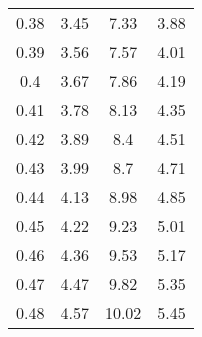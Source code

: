 \begin{table}
\begin{tabular}{cccc}
0.38 & 3.45 & 7.33 & 3.88 \\
0.39 & 3.56 & 7.57 & 4.01 \\
0.4 & 3.67 & 7.86 & 4.19 \\
0.41 & 3.78 & 8.13 & 4.35 \\
0.42 & 3.89 & 8.4 & 4.51 \\
0.43 & 3.99 & 8.7 & 4.71 \\
0.44 & 4.13 & 8.98 & 4.85 \\
0.45 & 4.22 & 9.23 & 5.01 \\
0.46 & 4.36 & 9.53 & 5.17 \\
0.47 & 4.47 & 9.82 & 5.35 \\
0.48 & 4.57 & 10.02 & 5.45 \\
\end{tabular}
\end{table}
